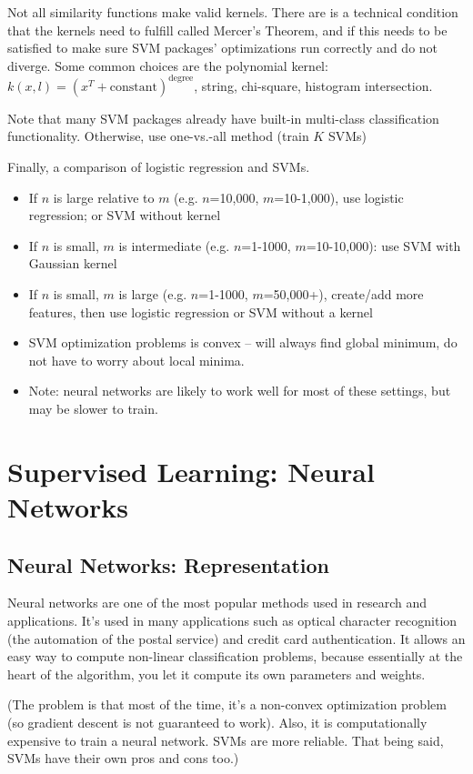 \documentclass[letterpaper,10pt]{article}
\begin{document}
Not all similarity functions make valid kernels. There are is a technical condition that the kernels need to fulfill called Mercer's Theorem, and if this needs to be satisfied to make sure SVM packages' optimizations run correctly and do not diverge. Some common choices are the polynomial kernel: $k(x,l) = (x^T + \text{constant})^\text{degree}$, string, chi-square, histogram intersection.

Note that many SVM packages already have built-in multi-class classification functionality. Otherwise, use one-vs.-all method (train $K$ SVMs)

Finally, a comparison of logistic regression and SVMs.
\begin{itemize}
	\item If $n$ is large relative to $m$ (e.g. $n$=10,000, $m$=10-1,000), use logistic regression; or SVM without kernel
	\item If $n$ is small, $m$ is intermediate (e.g. $n$=1-1000, $m$=10-10,000): use SVM with Gaussian kernel
	\item If $n$ is small, $m$ is large (e.g. $n$=1-1000, $m$=50,000+), create/add more features, then use logistic regression or SVM without a kernel
	\item SVM optimization problems is convex -- will always find global minimum, do not have to worry about local minima.
	\item Note: neural networks are likely to work well for most of these settings, but may be slower to train.
\end{itemize}




\section{Supervised Learning: Neural Networks}
\subsection{Neural Networks: Representation}
Neural networks are one of the most popular methods used in research and applications. It's used in many applications such as optical character recognition (the automation of the postal service) and credit card authentication. It allows an easy way to compute non-linear classification problems, because essentially at the heart of the algorithm, you let it compute its own parameters and weights.

(The problem is that most of the time, it's a non-convex optimization problem (so gradient descent is not guaranteed to work). Also, it is computationally expensive to train a neural network. SVMs are more reliable. That being said, SVMs have their own pros and cons too.)
\end{document}
